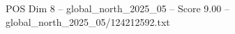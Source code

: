 \begin{textsample}{POS Dim 8 – global\_north\_2025\_05 – Score 9.00 – global\_north\_2025\_05/124212592.txt}
\end{textsample}
